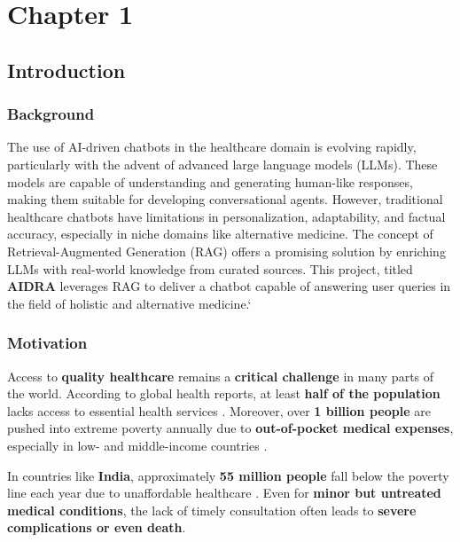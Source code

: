 \documentclass[12pt,a4paper]{report}
\newcommand{\titleKey}{AIDRA}
\begin{document}
	\renewcommand{\thesection}{\arabic{section}}
	
	\newpage
	{\vfill \chapter*{\centering \vfill Chapter 1 \vfill}\vfill}
	\thispagestyle{empty}
	\newpage

	\label{Introduction}
	\section{Introduction}

	\label{Background}
	\subsection{Background }
The use of AI-driven chatbots in the healthcare domain is evolving rapidly, particularly with the advent of advanced large language models (LLMs). These models are capable of understanding and generating human-like responses, making them suitable for developing conversational agents. However, traditional healthcare chatbots have limitations in personalization, adaptability, and factual accuracy, especially in niche domains like alternative medicine. The concept of Retrieval-Augmented Generation (RAG) offers a promising solution by enriching LLMs with real-world knowledge from curated sources. This project, titled \textbf{\titleKey} leverages RAG to deliver a chatbot capable of answering user queries in the field of holistic and alternative medicine.`


\label{Motivation}  
\subsection{Motivation}  

Access to \textbf{quality healthcare} remains a \textbf{critical challenge} in many parts of the world. According to global health reports, at least \textbf{half of the population} lacks access to essential health services \cite{worldbank_who}. Moreover, over \textbf{1 billion people} are pushed into extreme poverty annually due to \textbf{out-of-pocket medical expenses}, especially in low- and middle-income countries \cite{worldbank_who} .

In countries like \textbf{India}, approximately \textbf{55 million people} fall below the poverty line each year due to unaffordable healthcare \cite{phfi}. Even for \textbf{minor but untreated medical conditions}, the lack of timely consultation often leads to \textbf{severe complications or even death}.
\end{document}
